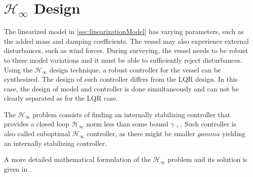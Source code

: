 \section{$\mathcal{H}_\infty$ Design}
The linearized model in \autoref{sec:linearizationModel} has varying parameters, such as the added mass and damping coefficients. The vessel may also experience external disturbances, such as wind forces. During surveying, the vessel needs to be robust to these model variations and it must be able to sufficiently reject disturbances. Using the $\mathcal{H}_\infty$ design technique, a robust controller for the vessel can be synthesized. The design of such controller differs from the LQR design. In this case, the design of model and controller is done simultaneously and can not be clearly separated as for the LQR case.

The $\mathcal{H}_\infty$ problem consists of finding an internally stabilizing controller that provides a closed loop $\mathcal{H}_\infty$ norm less than some bound $\gamma$ \cite[p. 835]{JCDoyle}, \cite[pp. 92-93]{AAStoorvogel}. Such controller is also called suboptimal $\mathcal{H}_\infty$ controller, as there might be smaller $gamma$ yielding an internally stabilizing controller.%

A more detailed mathematical formulation of the $\mathcal{H}_\infty$ problem and its solution is given in \cite[pp. 91-119]{AAStoorvogel}. 

